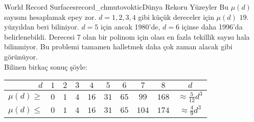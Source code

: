 \begin{surferIntroPage}{World Record Surfaces}{record_chmutovoktic}{Dünya Rekoru Yüzeyler}
Bu  $\mu(d)$  sayısını hesaplamak epey zor. $d=1,2,3,4$ gibi küçük dereceler için  $\mu(d)$ 
$19.$ yüzyıldan beri biliniyor. $d=5$ için ancak 1980'de, $d=6$ içinse daha 1996'da belirlenebildi.  
Derecesi 7 olan bir polinom için olası en fazla tekillik sayısı hala bilinmiyor.
Bu problemi tamamen halletmek daha çok zaman alacak gibi görünüyor. \\  Bilinen birkaç sonuç şöyle:
    
   \begin{center}
      \begin{tabular}{r|cccccccc|c}
        $d$ & $1$ & $2$ & $3$ & $4$ & $5$ & $6$ & $7$ & $8$ & $d$\\
        \hline
        \hline
        \rule{0pt}{1.2em}$\mu(d)\ge$ & $0$ & $1$ & $4$ & $16$ & $31$ & $65$ &
        $99$ & $168$ & 
        $\approx \frac{5}{12}d^3$\\[0.3em]
        \hline
        \rule{0pt}{1.2em}$\mu(d)\le$ & $0$ & $1$ & $4$ & $16$ & $31$ & $65$ &
        $104$ & $174$ & $\approx \frac{4}{9}d^3$
      \end{tabular}
    \end{center}
\end{surferIntroPage}
